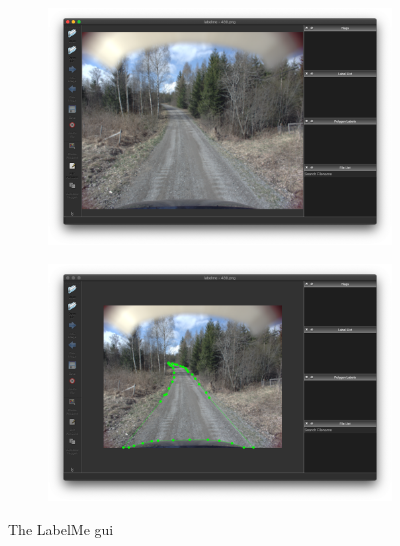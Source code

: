 \documentclass[USenglish]{ifimaster}  %
\begin{document}
\begin{figure}[ht]
\begin{subfigure}{.6\textwidth}
\includegraphics[width=.75\linewidth]{bilder/labelme_gui.png}
\label{fig:gui}
\end{subfigure}
\hspace*{\fill} %
\begin{subfigure}{.6\textwidth}
\includegraphics[width=.75\linewidth]{bilder/annotating.png}
\label{fig:polygon}
\end{subfigure}
\caption{The LabelMe \ac{gui}}
\end{figure}
\end{document}

